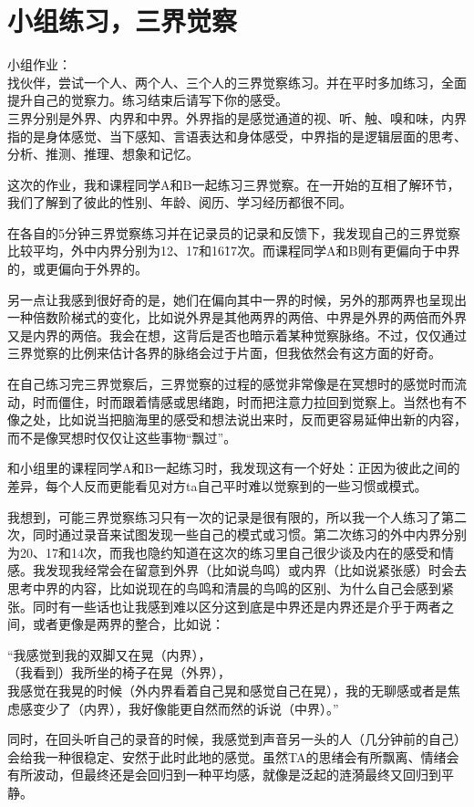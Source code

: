 \chapter{小组练习，三界觉察}







\noindent\textsf{小组作业：\\
找伙伴，尝试一个人、两个人、三个人的三界觉察练习。并在平时多加练习，全面提升自己的觉察力。练习结束后请写下你的感受。\\
三界分别是外界、内界和中界。外界指的是感觉通道的视、听、触、嗅和味，内界指的是身体感觉、当下感知、言语表达和身体感受，中界指的是逻辑层面的思考、分析、推测、推理、想象和记忆。}


这次的作业，我和课程同学A和B一起练习三界觉察。在一开始的互相了解环节，我们了解到了彼此的性别、年龄、阅历、学习经历都很不同。

在各自的5分钟三界觉察练习并在记录员的记录和反馈下，我发现自己的三界觉察比较平均，外中内界分别为12、17和16\~17次。而课程同学A和B则有更偏向于中界的，或更偏向于外界的。

另一点让我感到很好奇的是，她们在偏向其中一界的时候，另外的那两界也呈现出一种倍数阶梯式的变化，比如说外界是其他两界的两倍、中界是外界的两倍而外界又是内界的两倍。我会在想，这背后是否也暗示着某种觉察脉络。不过，仅仅通过三界觉察的比例来估计各界的脉络会过于片面，但我依然会有这方面的好奇。

在自己练习完三界觉察后，三界觉察的过程的感觉非常像是在冥想时的感觉\pozhehao{}时而流动，时而僵住，时而跟着情感或思绪跑，时而把注意力拉回到觉察上。当然也有不像之处，比如说当把脑海里的感受和想法说出来时，反而更容易延伸出新的内容，而不是像冥想时仅仅让这些事物“飘过”。

和小组里的课程同学A和B一起练习时，我发现这有一个好处：正因为彼此之间的差异，每个人反而更能看见对方ta自己平时难以觉察到的一些习惯或模式。

我想到，可能三界觉察练习只有一次的记录是很有限的，所以我一个人练习了第二次，同时通过录音来试图发现一些自己的模式或习惯。第二次练习的外中内界分别为20、17和14次，而我也隐约知道在这次的练习里自己很少谈及内在的感受和情感。我发现我经常会在留意到外界（比如说鸟鸣）或内界（比如说紧张感）时会去思考中界的内容，比如说现在的鸟鸣和清晨的鸟鸣的区别、为什么自己会感到紧张。同时有一些话也让我感到难以区分这到底是中界还是内界还是介乎于两者之间，或者更像是两界的整合，比如说：

“我感觉到我的双脚又在晃（内界），\\
（我看到）我所坐的椅子在晃（外界），\\
我感觉在我晃的时候（外内界\pozhehao{}看着自己晃和感觉自己在晃），我的无聊感或者是焦虑感变少了（内界），我好像能更自然而然的诉说（中界）。”

同时，在回头听自己的录音的时候，我感觉到声音另一头的人（几分钟前的自己）会给我一种很稳定、安然于此时此地的感觉。虽然TA的思绪会有所飘离、情绪会有所波动，但最终还是会回归到一种平均感，就像是泛起的涟漪最终又回归到平静。

